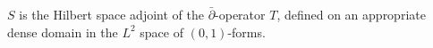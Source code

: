 
$S$ is the Hilbert space adjoint of the $\bar{\partial}$-operator $T$, defined on an appropriate dense domain in the $L^2$ space of $(0,1)$-forms.
